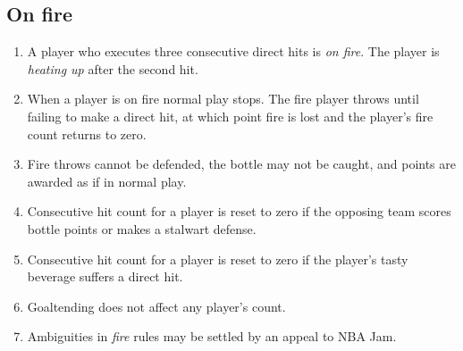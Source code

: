 \documentclass[11pt,letterpaper,twocolumn,english,DIV=calc]{scrartcl}
\begin{document}
\subsection{On fire}
\begin{enumerate}[leftmargin=2.8em, label=\thesubsection.\arabic*]
	\item A player who executes three consecutive direct hits is \emph{on fire}.
	The player is \emph{heating up} after the second hit.
	\item When a player is on fire normal play stops. 
	The fire player throws until failing to make a direct hit, at which point fire is lost and the player's fire count returns to zero.
	\item Fire throws cannot be defended, the bottle may not be caught, and points are awarded as if in normal play.
	\item Consecutive hit count for a player is reset to zero if the opposing team scores bottle points or makes a stalwart defense.
	\item Consecutive hit count for a player is reset to zero if the player's tasty beverage suffers a direct hit.
	\item Goaltending does not affect any player's count.
	\item Ambiguities in \emph{fire} rules may be settled by an appeal to NBA Jam.
\end{enumerate}
\end{document}

